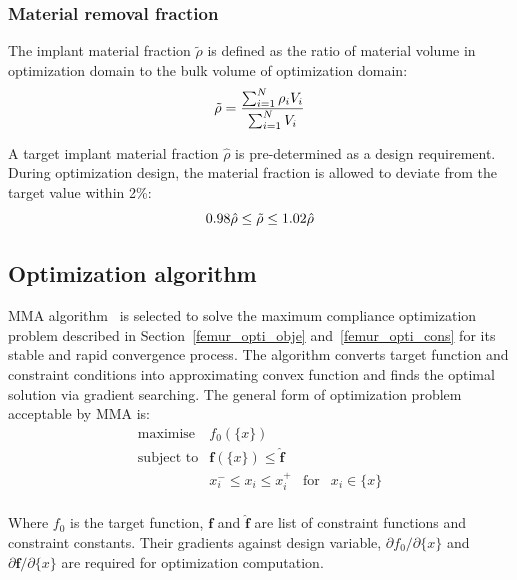 \documentclass[12pt]{extbook}
\begin{document}
\subsubsection{Material removal fraction}
\label{to_con_mrf}
The implant material fraction $\tilde{\rho}$ is defined as the ratio of material volume in optimization domain to the bulk volume of optimization domain:
\begin{equation}
\tilde{\rho} = \frac{\sum_{i=1}^N{\rho_iV_i}}{\sum_{i=1}^N{V_i}}\\
\label{3-3-1}
\end{equation}

A target implant material fraction $\hat{\rho}$ is pre-determined as a design requirement. During optimization design, the material fraction is allowed to deviate from the target value within 2\%:
\begin{equation}
0.98\hat{\rho} \leq \tilde{\rho} \leq 1.02\hat{\rho}\\
\label{3-3-2}
\end{equation}


\subsection{Optimization algorithm}

MMA algorithm~\cite{svanberg1987method} is selected to solve the maximum compliance optimization problem described in Section~\ref{femur_opti_obje} and~\ref{femur_opti_cons} for its stable and rapid convergence process. The algorithm converts target function and constraint conditions into approximating convex function and finds the optimal solution via gradient searching. The general form of optimization problem acceptable by MMA is:
\begin{equation}
\begin{array}{llll}
\text{maximise} & f_0(\{x\})\\
\text{subject to} & \bm{f}(\{x\}) \leq \hat{\bm{f}}\\
& x_i^- \leq x_{i} \leq x_i^+ & \text{for} & x_i \in \{x\}\\
\end{array}
\label{3-4-1}
\end{equation}

Where $f_0$ is the target function, $\bm{f}$ and $\hat{\bm{f}}$ are list of constraint functions and constraint constants. Their gradients against design variable, $\partial f_0 / \partial \{x\}$ and $\partial \bm{f} / \partial \{x\}$ are required for optimization computation.\\
\end{document}

